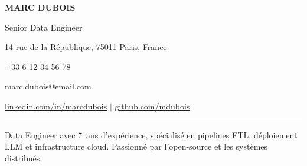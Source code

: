 \newcommand{\cvsubsection}[2]{%
    \needspace{2\baselineskip}%
    \subsection*{#1}%
    \hfill #2%
    \vspace{1pt}%
}

\newcommand{\cvsubsubsection}[2]{%
    \needspace{3\baselineskip}%
    \noindent\textbf{#1} #2%
    \vspace{1pt}%
}



\begin{center}
    {\Huge\bfseries\color{primary} MARC DUBOIS}

    \vspace{4pt}
    {\large\color{secondary} Senior Data Engineer}

    \vspace{6pt}
    {\small\color{accent} 14 rue de la République, 75011 Paris, France}

    \vspace{2pt}
    {\small\color{accent} +33 6 12 34 56 78}

    \vspace{2pt}
    {\small\color{accent} marc.dubois@email.com}

    \vspace{6pt}
    {\small\color{accent}
        \href{https://linkedin.com/in/marcdubois}{linkedin.com/in/marcdubois}
        \hspace{12pt}$|$\hspace{12pt}
        \href{https://github.com/mdubois}{github.com/mdubois}
    }
\end{center}

\vspace{4pt}
\noindent\rule{\textwidth}{0.5pt}


Data Engineer avec 7~ans d'expérience, spécialisé en pipelines ETL, déploiement LLM et infrastructure cloud. Passionné par l'open-source et les systèmes distribués.


